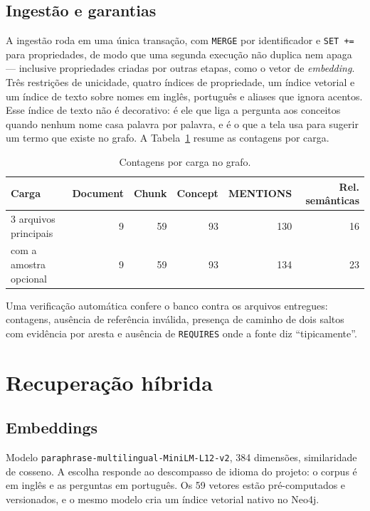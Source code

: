 \documentclass[12pt]{article}
\begin{document}
\subsection{Ingestão e garantias}

A ingestão roda em uma única transação, com \texttt{MERGE} por identificador e \texttt{SET +=}
para propriedades, de modo que uma segunda execução não duplica nem apaga --- inclusive
propriedades criadas por outras etapas, como o vetor de \emph{embedding}. Três restrições de
unicidade, quatro índices de propriedade, um índice vetorial e um índice de texto sobre nomes
em inglês, português e aliases que ignora acentos. Esse índice de texto não é decorativo: é ele
que liga a pergunta aos conceitos quando nenhum nome casa palavra por palavra, e é o que a tela
usa para sugerir um termo que existe no grafo. A Tabela~\ref{tab:carga} resume as contagens por carga.

\begin{table}[h]
\centering
\caption{Contagens por carga no grafo.}
\label{tab:carga}
\footnotesize
\begin{tabular}{@{}lrrrrr@{}}
\toprule
Carga & Document & Chunk & Concept & MENTIONS & Rel. semânticas \\
\midrule
3 arquivos principais & 9 & 59 & 93 & 130 & 16 \\
com a amostra opcional & 9 & 59 & 93 & 134 & 23 \\
\bottomrule
\end{tabular}
\end{table}

Uma verificação automática confere o banco contra os arquivos entregues: contagens, ausência de
referência inválida, presença de caminho de dois saltos com evidência por aresta e ausência de
\texttt{REQUIRES} onde a fonte diz ``tipicamente''.

\section{Recuperação híbrida}

\subsection{Embeddings}

Modelo \texttt{paraphrase-multilingual-MiniLM-L12-v2}, 384 dimensões, similaridade de cosseno. A
escolha responde ao descompasso de idioma do projeto: o corpus é em inglês e as perguntas em
português. Os 59 vetores estão pré-computados e versionados, e o mesmo modelo cria um índice
vetorial nativo no Neo4j.
\end{document}
